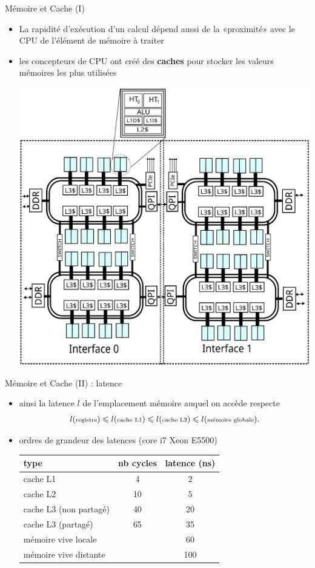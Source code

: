 \documentclass[11pt,mathserif]{beamer}
\newcommand{\gezi}{\faLongArrowRight}
\begin{document}
\begin{frame}{Mémoire et Cache (I)}
\begin{itemize}[<+->]
  \item La rapidité d'exécution d'un calcul dépend aussi de la «proximité» avec le CPU de l'élément de mémoire à traiter 
  \item[\gezi] les concepteurs de CPU ont créé des {\bf caches} pour stocker les valeurs mémoires les plus utilisées
  \begin{center}
    \colorbox{white}{\includegraphics[width=0.5\linewidth]{fig/cpu_shared.eps}}
  \end{center}
\end{itemize}
\end{frame}

\begin{frame}{Mémoire et Cache (II) : latence}
\pause
  \begin{itemize}[<+->]
  \item ainsi la latence $l$ de l'emplacement mémoire auquel on accède  respecte
  $$l({\mbox{\scriptsize registre}}) \leqslant l(\mbox{\scriptsize cache L1}) \leqslant
    l(\mbox{\scriptsize cache L2}) \leqslant l(\mbox{\scriptsize mémoire globale}).$$
  \item ordres de grandeur des latences (core i7 Xeon E5500)
    \begin{tabular}{|l|c|c|}
    \hline
      type & nb cycles & latence (ns)  \\
    \hline
      cache L1  &  4 & 2 \\
      cache L2  &  10 & 5 \\
      cache L3 (non partagé) & 40 & 20  \\
      cache L3 (partagé) &  65 & 35  \\
      mémoire vive locale & & 60 \\
      mémoire vive distante & & 100 \\
    \hline
    \end{tabular}
  \end{itemize}
\end{frame}
\end{document}

